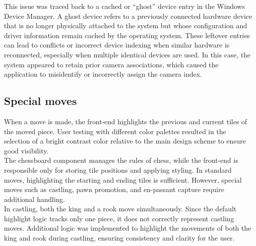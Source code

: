 This issue was traced back to a cached or “ghost” device entry in the Windows Device Manager. A ghost device refers to a previously connected hardware device that is no longer physically attached to the system but whose configuration and driver information remain cached by the operating system. These leftover entries can lead to conflicts or incorrect device indexing when similar hardware is reconnected, especially when multiple identical devices are used. In this case, the system appeared to retain prior camera associations, which caused the application to misidentify or incorrectly assign the camera index.

\subsection{Special moves}
When a move is made, the front-end highlights the previous and current tiles of the moved piece. User testing with different color palettes resulted in the selection of a bright contrast color relative to the main design scheme to ensure good visibility. \\

The chessboard component manages the rules of chess, while the front-end is responsible only for storing tile positions and applying styling. In standard moves, highlighting the starting and ending tiles is sufficient. However, special moves such as \gls{castling}, pawn \gls{promotion}, and \gls{en-passant} capture require additional handling. \\

In \gls{castling}, both the king and a rook move simultaneously. Since the default highlight logic tracks only one piece, it does not correctly represent \gls{castling} moves. Additional logic was implemented to highlight the movements of both the king and rook during \gls{castling}, ensuring consistency and clarity for the user.



